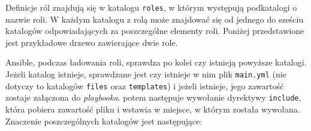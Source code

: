 Definicje ról znajdują się w katalogu \texttt{roles}, w którym występują podkatalogi o nazwie roli.
W każdym katalogu z rolą może znajdować się od jednego do sześciu katalogów odpowiadających za poszczególne elementy roli.
Poniżej przedstawione jest przykładowe drzewo zawierające dwie role.

Ansible, podczas ładowania roli, sprawdza po kolei czy istnieją powyższe katalogi.
Jeżeli katalog istnieje, sprawdzane jest czy istnieje w nim plik \texttt{main.yml} (nie dotyczy to katalogów \texttt{files} oraz \texttt{templates}) i jeżeli istnieje, jego zawartość zostaje załączona do \textit{playbooka}.
potem następuje wywołanie dyrektywy \texttt{include}, która pobiera zawartość pliku i wstawia w miejsce, w którym została wywołana.\\
Znaczenie poszczególnych katalogów jest następujące:
